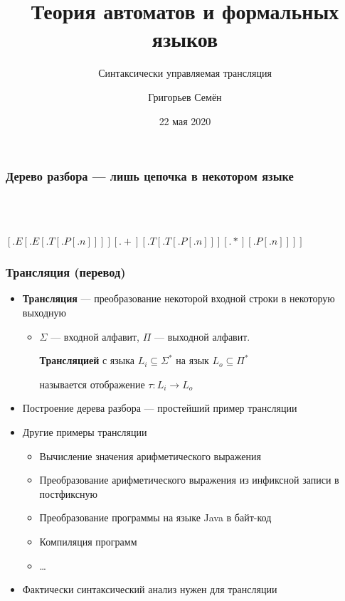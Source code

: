 \documentclass{beamer}
\title[]{Теория автоматов и формальных языков}
\subtitle[]{Синтаксически управляемая трансляция}
\institute[]{
Санкт-Петербургский государственный университет\\
}
\author[]{Григорьев Семён}
\date{22 мая 2020}
\begin{document}
{
  \begin{frame}
    \titlepage
  \end{frame}
}

\begin{frame}[fragile]
  \transwipe[direction=90]
  \frametitle{Дерево разбора --- лишь цепочка в некотором языке }
\begin{center}
  \pause
  
  ~\\~
  
$[.E [.E [.T [.P [.n ] ] ] ] [.+ ] [.T [.T [.P [.n ] ] ] [.* ] [.P [.n ] ] ] ]$  
\end{center}  
\end{frame}


\begin{frame}[fragile]
  \transwipe[direction=90]
  \frametitle{Трансляция (перевод)}
  \begin{itemize}
    \item \textbf{Трансляция} --- преобразование некоторой входной строки в некоторую выходную
    \begin{itemize}
      \item $\Sigma$ --- входной алфавит, $\Pi$ --- выходной алфавит. 
      
      \textbf{Трансляцией} с языка $L_i \subseteq \Sigma^*$ на язык $L_o \subseteq \Pi^*$ 
      
      называется отображение $\tau : L_i \rightarrow L_o$
    \end{itemize}
    \item Построение дерева разбора --- простейший пример трансляции
    \item Другие примеры трансляции
    \begin{itemize}
      \item Вычисление значения арифметического выражения
      \item Преобразование арифметического выражения из инфиксной записи в постфиксную
      \item Преобразование программы на языке Java в байт-код
      \item Компиляция программ
      \item \dots
    \end{itemize}
    \item Фактически синтаксический анализ нужен для трансляции
  \end{itemize}
\end{frame}
\end{document}
